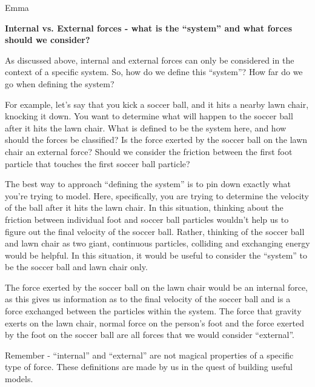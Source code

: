 \begin{studentOpinion}{Emma}

\textbf{Internal vs. External forces - what is the ``system'' and what forces should we consider?}

As discussed above, internal and external forces can only be considered in the context of a specific system. So, how do we define this ``system''? How far do we go when defining the system?

For example, let's say that you kick a soccer ball, and it hits a nearby lawn chair, knocking it down. You want to determine what will happen to the soccer ball after it hits the lawn chair. What is defined to be the system here, and how should the forces be classified? Is the force exerted by the soccer ball on the lawn chair an external force? Should we consider the friction between the first foot particle that touches the first soccer ball particle?

The best way to approach ``defining the system'' is to pin down exactly what you're trying to model. Here, specifically, you are trying to determine the velocity of the ball after it hits the lawn chair. In this situation, thinking about the friction between individual foot and soccer ball particles wouldn't help us to figure out the final velocity of the soccer ball. Rather, thinking of the soccer ball and lawn chair as two giant, continuous particles, colliding and exchanging energy would be helpful. In this situation, it would be useful to consider the ``system'' to be the soccer ball and lawn chair only.

 The force exerted by the soccer ball on the lawn chair would be an internal force, as this gives us information as to the final velocity of the soccer ball and is a force exchanged between the particles within the system. The force that gravity exerts on the lawn chair, normal force on the person's foot and the force exerted by the foot on the soccer ball are all forces that we would consider ``external''.

Remember - ``internal'' and ``external'' are not magical properties of a specific type of force. These definitions are made by us in the quest of building useful models.
\end{studentOpinion}

